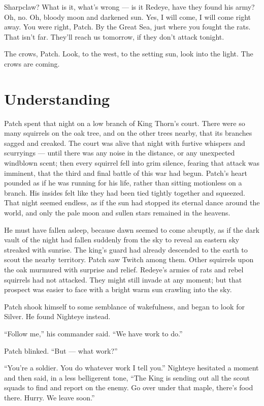 \documentclass[ebook,oneside,openany,17pt]{memoir}
\newenvironment{tolerant}[1]{%
  \par\tolerance=#1\relax
}{%
  \par
}
\renewcommand{\thechapter}{\Roman{chapter}}
\newcounter{sections}
\newcommand{\sections}[1]{%
  \section*{#1}
  \addtocounter{sections}{1}%
  \pdfbookmark[1]{#1}{section.\thechapter.\thesections}}
\begin{document}
Sharpclaw? What is it, what’s wrong — is it Redeye, have they found
his army? Oh, no. Oh, bloody moon and darkened sun. Yes, I will come,
I will come right away. You were right, Patch. By the Great Sea, just
where you fought the rats. That isn’t far. They’ll reach us tomorrow,
if they don’t attack tonight.

The crows, Patch. Look, to the west, to the setting sun, look into the
light. The crows are coming.


\sections{Understanding}

\begin{tolerant}{1000}
Patch spent that night on a low branch of King Thorn’s court. There
were so many squirrels on the oak tree, and on the other trees nearby,
that its branches sag\-ged and creaked. The court was alive that night
with furtive whispers and scurryings — until there was any noise in
the distance, or any unexpected windblown scent; then every squirrel
fell into grim silence, fearing that attack was imminent, that the
third and final battle of this war had begun. Patch’s heart pounded as
if he was running for his life, rather than sitting motionless on a
branch. His insides felt like they had been tied tightly together and
squeezed. That night seemed endless, as if the sun had stopped its
eternal dance around the world, and only the pale moon and sullen
stars remained in the heavens.
\end{tolerant}

\begin{tolerant}{2000}
He must have fallen asleep, because dawn seemed to come abruptly, as
if the dark vault of the night had fallen suddenly from the sky to
reveal an eastern sky streaked with sunrise. The king’s guard had
already descended to the earth to scout the nearby territory. Patch
saw Twitch among them. Other squirrels upon the oak murmured with
surprise and relief. Redeye’s armies of rats and rebel squirrels had
not attacked. They might still invade at any moment; but that prospect
was easier to face with a bright warm sun crawling into the sky.
\end{tolerant}

Patch shook himself to some semblance of wakefulness, and began to
look for Silver. He found Nighteye instead.

“Follow me,” his commander said. “We have work to do.”

Patch blinked. “But — what work?”

“You’re a soldier. You do whatever work I tell you.” Nighteye
hesitated a moment and then said, in a less belligerent tone, “The
King is sending out all the scout squads to find and report on the
enemy. Go over under that maple, there’s food there. Hurry. We leave
soon.”
\end{document}
